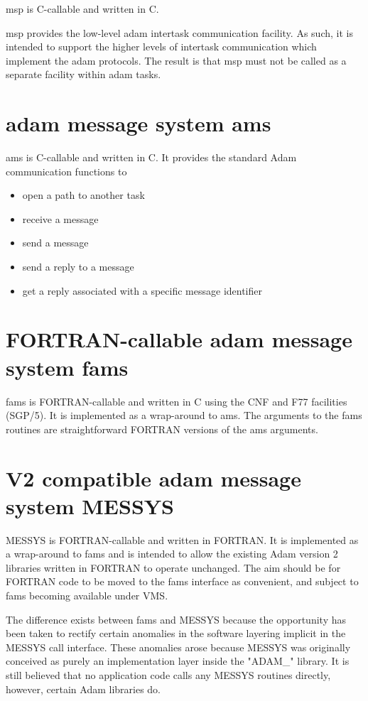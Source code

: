 msp is C-callable and written in C.

msp provides the low-level adam intertask communication facility. As
such, it is intended to support the higher levels of intertask
communication which implement the adam protocols. The result is that msp
must not be called as a separate facility within adam tasks.

\section {adam message system ams}

ams is C-callable and written in C. It provides the standard Adam
communication functions to

\begin{itemize}
\item open a path to another task
\item receive a message
\item send a message
\item send a reply to a message
\item get a reply associated with a specific message identifier
\end{itemize}

\section {FORTRAN-callable adam message system fams}

fams is FORTRAN-callable and written in C using the CNF and F77
facilities (SGP/5). It is implemented as a wrap-around to ams. The arguments 
to the fams routines are straightforward FORTRAN versions of the ams
arguments.

\section {V2 compatible adam message system MESSYS}

MESSYS is FORTRAN-callable and written in FORTRAN. It is implemented as a
wrap-around to fams and is intended to allow the existing Adam version 2
libraries written in FORTRAN to operate unchanged. The aim should be for
FORTRAN code to be moved to the fams interface as convenient, and subject
to fams becoming available under VMS.

The difference exists between fams and MESSYS because the opportunity has
been taken to rectify certain anomalies in the software layering implicit
in the MESSYS call interface. These anomalies arose because MESSYS was
originally conceived as purely an implementation layer inside the "ADAM\_"
library. It is still believed that no application code calls any MESSYS
routines directly, however, certain Adam libraries do.

